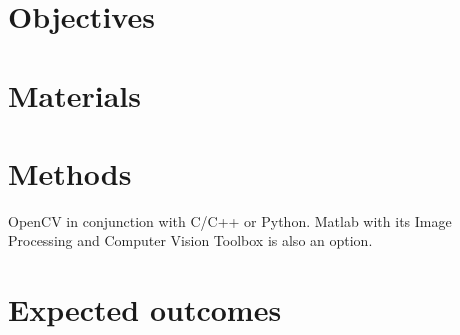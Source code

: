 \documentclass[review]{elsarticle}
\begin{document}
\section{Objectives}

\section{Materials}

\section{Methods}

OpenCV in conjunction with C/C++ or Python. Matlab with its Image Processing and Computer Vision Toolbox is also an option.

\section{Expected outcomes}
\end{document}
